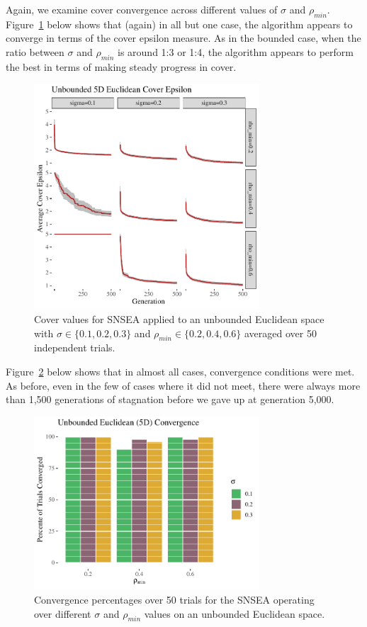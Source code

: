\documentclass[twoside]{article}
\begin{document}
Again, we examine cover convergence across different values of $\sigma$ and $\rho_{min}$.  Figure~\ref{fig:unbounded:nopop:sm} below shows that (again) in all but one case, the algorithm appears to converge in terms of the cover epsilon measure.  As in the bounded case, when the ratio between $\sigma$ and $\rho_{min}$ is around 1:3 or 1:4, the algorithm appears to perform the best in terms of making steady progress in cover.  
%
\begin{figure}[ht]
  \center\includegraphics[width=0.75\textwidth]{Figures/unbounded-500sm-NOPOP.pdf}
  \caption{\label{fig:unbounded:nopop:sm} Cover values for SNSEA applied to an unbounded Euclidean space with $\sigma\in\{0.1, 0.2, 0.3\}$ and $\rho_{min} \in \{0.2, 0.4, 0.6\}$ averaged over 50 independent trials.}
\end{figure}

Figure~\ref{fig:bounded:nopop:conv} below shows that in almost all cases, convergence conditions were met.  As before, even in the few of cases where it did not meet, there were always more than 1,500 generations of stagnation before we gave up at generation 5,000.  
%
\begin{figure}[ht]
  \center\includegraphics[width=0.75\textwidth]{Figures/unbounded-conv-NOPOP.pdf}
  \caption{\label{fig:bounded:nopop:conv} Convergence percentages over 50 trials for the SNSEA operating over different $\sigma$ and $\rho_{min}$ values on an unbounded Euclidean space.}
\end{figure}
\end{document}
